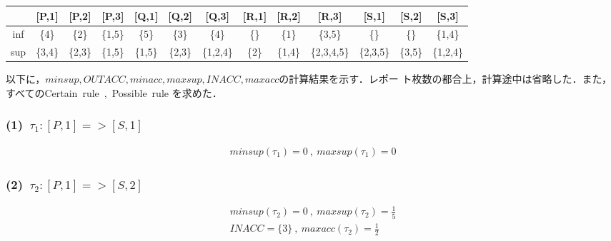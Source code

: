 \documentclass[a4paper,12pt]{jarticle}
\begin{document}
%
\title{\vspace{-30mm} }
\date{}
%
\maketitle
%
\vspace{-20mm}
%
\setlength{\abovedisplayskip}{0pt} %
\setlength{\belowdisplayskip}{0pt} %

\vspace{-3mm}
%
 \begin{table}[htbp]
  \fontsize{10pt}{11pt}\selectfont
  \begin{tabular}{c|cccccccccccc}
       &[P,1]&[P,2]&[P,3]&[Q,1]&[Q,2]&[Q,3]&[R,1]&[R,2]&[R,3]&[S,1]&[S,2]&[S,3]\\\hline
   inf &\{4\}&\{2\}&\{1,5\}&\{5\}&\{3\}&\{4\}&\{\}&\{1\}&\{3,5\}&\{\}&\{\}&\{1,4\}\\
   sup &\{3,4\}&\{2,3\}&\{1,5\}&\{1,5\}&\{2,3\}&\{1,2,4\}&\{2\}&\{1,4\}&\{2,3,4,5\}&\{2,3,5\}&\{3,5\}&\{1,2,4\} 
  \end{tabular}
 \end{table}
%
以下に，$minsup,OUTACC,minacc,maxsup,INACC,maxacc$の計算結果を示す．レポー
ト枚数の都合上，計算途中は省略した．また，すべてのCertain~rule~,~Possible~rule
を求めた．
\subsubsection*{(1)~$\tau_1:[P,1]=>[S,1]$}
\vspace{-4mm}
%
\begin{align*}
 minsup(\tau_1)=0~,~maxsup(\tau_1)=0
\end{align*}
%
\vspace{-10mm}
\subsubsection*{(2)~$\tau_2:[P,1]=>[S,2]$}
\vspace{-4mm}
%
\begin{align*}
 minsup(\tau_2)=0~,~maxsup(\tau_2)=\frac{1}{5}\\
 INACC=\{3\}~,~maxacc(\tau_2)=\frac{1}{2}
\end{align*}
%
\vspace{-10mm}
\end{document}
